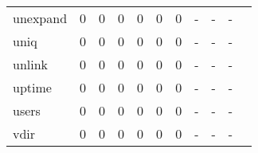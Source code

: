 \begin{longtable}{lp{1.2cm}p{1.2cm}p{1.2cm}p{1.2cm}p{1.2cm}p{1.2cm}p{1.2cm}p{1.2cm}p{1.2cm}p{1.2cm}}
unexpand  &                                     0 &                                                  0 &                                                  0 &                                                  0 &                                                  0 &                                                  0 &                                                  - &                                                  - &                                                  - \\
uniq      &                                     0 &                                                  0 &                                                  0 &                                                  0 &                                                  0 &                                                  0 &                                                  - &                                                  - &                                                  - \\
unlink    &                                     0 &                                                  0 &                                                  0 &                                                  0 &                                                  0 &                                                  0 &                                                  - &                                                  - &                                                  - \\
uptime    &                                     0 &                                                  0 &                                                  0 &                                                  0 &                                                  0 &                                                  0 &                                                  - &                                                  - &                                                  - \\
users     &                                     0 &                                                  0 &                                                  0 &                                                  0 &                                                  0 &                                                  0 &                                                  - &                                                  - &                                                  - \\
vdir      &                                     0 &                                                  0 &                                                  0 &                                                  0 &                                                  0 &                                                  0 &                                                  - &                                                  - &                                                  - \\

\end{longtable}
